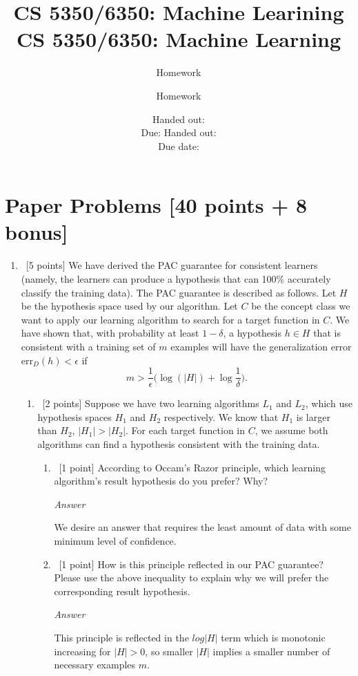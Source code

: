 \documentclass[12pt, fullpage,letterpaper]{article}
\title{CS 5350/6350: Machine Learining \semester}
\author{Homework \assignmentId}
\date{Handed out: \releaseDate\\
	Due: \dueDate}
\title{CS 5350/6350: Machine Learning \semester}
\author{Homework \assignmentId}
\date{Handed out: \releaseDate\\
  Due date: \dueDate}
\begin{document}
\maketitle



\section{Paper Problems [40 points + 8 bonus]}
\begin{enumerate}
\item~[5 points] We have derived the PAC guarantee for consistent learners (namely, the learners can produce a hypothesis that can 100\% accurately classify the training data). The PAC guarantee is described as follows. Let $H$ be the hypothesis space used by our algorithm. Let $C$ be the concept class we want to apply our learning algorithm to search for a target function in $C$. We have shown that,  with probability at least $1-\delta$, a hypothesis $h\in H$ that is consistent with a training set of $m$ examples will have the generalization error $\mathrm{err}_D(h) < \epsilon$ if 
\[
m > \frac{1}{\epsilon}\big(\log(|H|) + \log\frac{1}{\delta}\big).
\]

\begin{enumerate}
	\item~[2 points] Suppose we have two learning algorithms $L_1$ and $L_2$, which use hypothesis spaces $H_1$ and $H_2$ respectively. We know that $H_1$ is larger than $H_2$, \ie $|H_1| > |H_2|$.
	For each target function in $C$, we assume both algorithms can find a hypothesis consistent with the training data. 
	\begin{enumerate}
		\item~[1 point] According to Occam's Razor principle, which learning algorithm's  result hypothesis do you prefer? Why?
		
		\emph{Answer}
		
		We desire an answer that requires the least amount of data with some minimum level of confidence.
		
		\item~[1 point]  How is this principle reflected in our PAC guarantee? Please use the above inequality to explain why we will prefer the corresponding result hypothesis. 
		
		\emph{Answer}
		
		This principle is reflected in the $log|H|$ term which is monotonic increasing for $|H|>0$, so smaller $|H|$ implies a smaller number of necessary examples $m$.
		

\end{enumerate}
\end{enumerate}
\end{enumerate}
\end{document}
